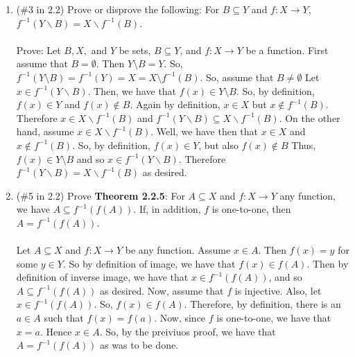 \documentclass[12pt]{article}
\begin{document}
\begin{enumerate}
\item (\#3 in 2.2) Prove or disprove the following: For $B\subseteq Y$ and $f:X\to Y$, $f^{-1}(Y\backslash B)=X\backslash f^{-1}(B)$.\\\\
Prove: Let $B, X,$ and $Y$ be sets, $B\subseteq Y$, and $f:X\rightarrow Y$ be a function. First assume that $B=\emptyset$. Then $Y\setminus B=Y$. So, $f^{-1}(Y\setminus B)=f^{-1}(Y)=X=X\setminus f^{-1}(B)$. So, assume that $B\neq\emptyset$ Let $x\in f^{-1}(Y\backslash B)$. Then, we have that $f(x)\in Y\setminus B$. So, by definition, $f(x)\in Y$ and $f(x)\notin B$. Again by definition, $x\in X$ but $x\notin f^{-1}(B)$. Therefore $x\in X\backslash f^{-1}(B)$ and $f^{-1}(Y\backslash B)\subseteq X\backslash f^{-1}(B)$. On the other hand, assume $x\in X\backslash f^{-1}(B)$. Well, we have then that $x\in X$ and $x\notin f^{-1}(B)$. So, by definition, $f(x)\in Y$, but also $f(x)\notin B$ Thus, $f(x)\in Y\setminus B$ and so $x\in f^{-1}(Y\backslash B)$. Therefore $f^{-1}(Y\backslash B)=X\backslash f^{-1}(B)$ as desired.\\[20pt]


\item (\#5 in 2.2) Prove \textbf{Theorem 2.2.5}: For $A\subseteq X$ and $f:X\to Y$ any function, we have $A\subseteq f^{-1}(f(A))$. If, in addition, $f$ is one-to-one, then $A=f^{-1}(f(A))$.\\\\
Let $A\subseteq X$ and $f:X\to Y$ be any function. Assume $x\in A$. Then $f(x)=y$ for some $y\in Y$. So by definition of image, we have that $f(x)\in f(A)$. Then by definition of inverse image, we have that $x\in f^{-1}(f(A))$, and so $A\subseteq f^{-1}(f(A))$ as desired. Now, assume that $f$ is injective. Also, let $x\in f^{-1}(f(A))$. So, $f(x)\in f(A)$. Therefore, by definition, there is an $a\in A$ such that $f(x)=f(a)$. Now, since $f$ is one-to-one, we have that $x=a$. Hence $x\in A$. So, by the preiviuos proof, we have that $A=f^{-1}(f(A))$ as was to be done.\\[20pt]



\end{enumerate}
\end{document}

